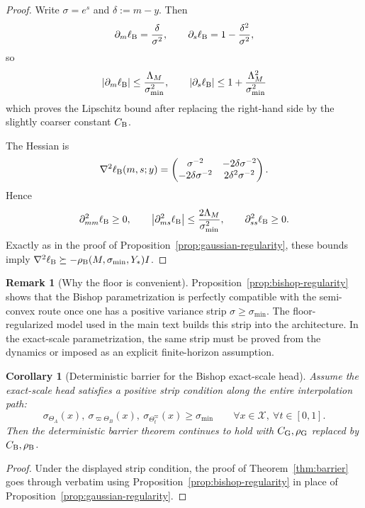 \documentclass[11pt]{article}
\newtheorem{corollary}[theorem]{Corollary}
\theoremstyle{definition}
\newtheorem{remark}[theorem]{Remark}
\newcommand{\abs}[1]{\left\lvert #1 \right\rvert}
\newcommand{\mc}[1]{\mathcal{#1}}
\begin{document}
\begin{proof}
Write $\sigma=e^s$ and $\delta:=m-y$. Then
\[
  \partial_m\ell_{\rm B}=\frac{\delta}{\sigma^2},
  \qquad
  \partial_s\ell_{\rm B}=1-\frac{\delta^2}{\sigma^2},
\]
so
\[
  \abs{\partial_m\ell_{\rm B}}
  \le
  \frac{\Lambda_M}{\sigma_{\min}^2},
  \qquad
  \abs{\partial_s\ell_{\rm B}}
  \le
  1+\frac{\Lambda_M^2}{\sigma_{\min}^2}
\]
which proves the Lipschitz bound after replacing the right-hand side by the
slightly coarser constant $C_{\rm B}$.

The Hessian is
\[
  \nabla^2\ell_{\rm B}(m,s;y)
  =
  \begin{pmatrix}
    \sigma^{-2} & -2\delta\sigma^{-2} \\
    -2\delta\sigma^{-2} & 2\delta^2\sigma^{-2}
  \end{pmatrix}.
\]
Hence
\[
  \partial_{mm}^2\ell_{\rm B}\ge 0,
  \qquad
  \abs{\partial_{ms}^2\ell_{\rm B}}
  \le
  \frac{2\Lambda_M}{\sigma_{\min}^2},
  \qquad
  \partial_{ss}^2\ell_{\rm B}
  \ge 0.
\]
Exactly as in the proof of Proposition~\ref{prop:gaussian-regularity}, these bounds
imply
$\nabla^2\ell_{\rm B}\succeq -\rho_{\rm B}(M,\sigma_{\min},Y_\ast)I$.
\end{proof}

\begin{remark}[Why the floor is convenient]
Proposition~\ref{prop:bishop-regularity} shows that the Bishop parametrization
is perfectly compatible with the semi-convex route once one has a positive
variance strip $\sigma\ge \sigma_{\min}$. The floor-regularized model used in
the main text builds this strip into the architecture. In the exact-scale
parametrization, the same strip must be proved from the dynamics or imposed as
an explicit finite-horizon assumption.
\end{remark}

\begin{corollary}[Deterministic barrier for the Bishop exact-scale head]
\label{cor:bishop-barrier}
Assume the exact-scale head satisfies a positive strip condition along the
entire interpolation path:
\[
  \sigma_{\Theta_A}(x),\ \sigma_{\varpi\Theta_B}(x),\ \sigma_{\Theta_t^\varpi}(x)
  \ge
  \sigma_{\min}
  \qquad
  \forall x\in\mc{X},\ \forall t\in[0,1].
\]
Then the deterministic barrier theorem continues to hold with
$C_{\rm G},\rho_{\rm G}$ replaced by $C_{\rm B},\rho_{\rm B}$.
\end{corollary}

\begin{proof}
Under the displayed strip condition, the proof of
Theorem~\ref{thm:barrier} goes through verbatim using
Proposition~\ref{prop:bishop-regularity} in place of
Proposition~\ref{prop:gaussian-regularity}.
\end{proof}
\end{document}
